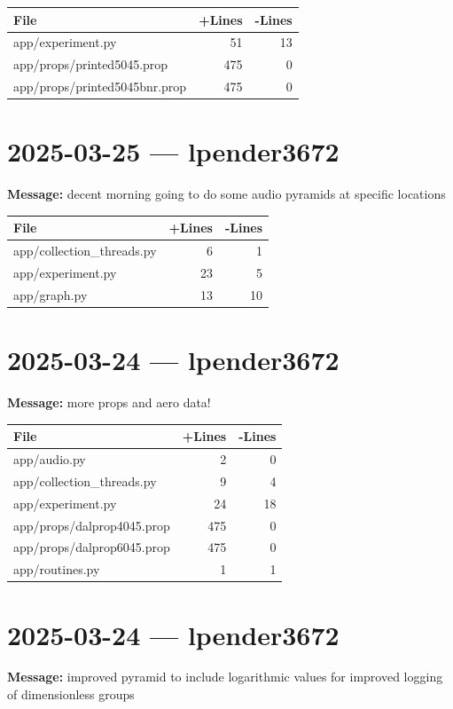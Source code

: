 \documentclass{article}
\begin{document}
\begin{longtable}{|p{10cm}|r|r|}
\hline \textbf{File} & \textbf{+Lines} & \textbf{-Lines} \\
\hline
app/experiment.py & 51 & 13 \\
\hline
app/props/printed5045.prop & 475 & 0 \\
\hline
app/props/printed5045bnr.prop & 475 & 0 \\
\hline
\end{longtable}

\section*{2025-03-25 --- lpender3672}
\textbf{Message:} decent morning going to do some audio pyramids at specific locations

\begin{longtable}{|p{10cm}|r|r|}
\hline \textbf{File} & \textbf{+Lines} & \textbf{-Lines} \\
\hline
app/collection\_threads.py & 6 & 1 \\
\hline
app/experiment.py & 23 & 5 \\
\hline
app/graph.py & 13 & 10 \\
\hline
\end{longtable}

\section*{2025-03-24 --- lpender3672}
\textbf{Message:} more props and aero data!

\begin{longtable}{|p{10cm}|r|r|}
\hline \textbf{File} & \textbf{+Lines} & \textbf{-Lines} \\
\hline
app/audio.py & 2 & 0 \\
\hline
app/collection\_threads.py & 9 & 4 \\
\hline
app/experiment.py & 24 & 18 \\
\hline
app/props/dalprop4045.prop & 475 & 0 \\
\hline
app/props/dalprop6045.prop & 475 & 0 \\
\hline
app/routines.py & 1 & 1 \\
\hline
\end{longtable}

\section*{2025-03-24 --- lpender3672}
\textbf{Message:} improved pyramid to include logarithmic values for improved logging of dimensionless groups
\end{document}
